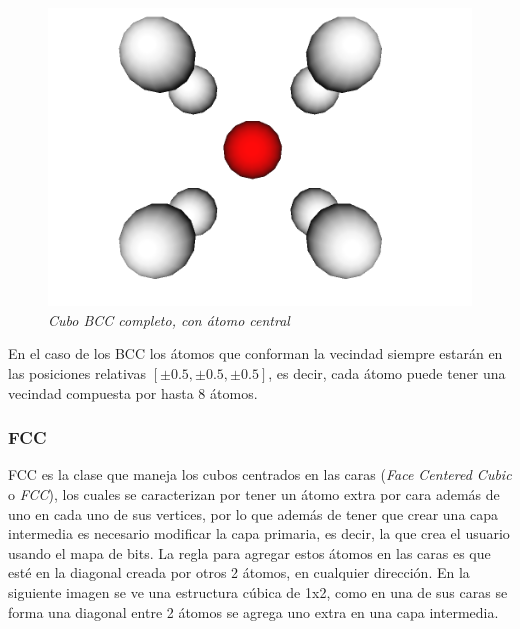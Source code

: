 \begin{figure}[H]
  \centering
  \includegraphics[scale=.3]{images/BCC-complete-molecule}
  \caption{\em Cubo BCC completo, con átomo central}
\end{figure}

En el caso de los BCC los átomos que conforman la vecindad siempre estarán en las posiciones relativas $[\pm 0.5, \pm 0.5, \pm 0.5]$, es decir, cada átomo puede tener una vecindad compuesta por hasta 8 átomos.

\subsubsection{FCC}
FCC es la clase que maneja los cubos centrados en las caras (\emph{Face Centered Cubic} o \emph{FCC}), los cuales se caracterizan por tener un átomo extra por cara además de uno en cada uno de sus vertices, por lo que además de tener que crear una capa intermedia es necesario modificar la capa primaria, es decir, la que crea el usuario usando el mapa de bits. La regla para agregar estos átomos en las caras es que esté en la diagonal creada por otros 2 átomos, en cualquier dirección. En la siguiente imagen se ve una estructura cúbica de 1x2, como en una de sus caras se forma una diagonal entre 2 átomos se agrega uno extra en una capa intermedia.

